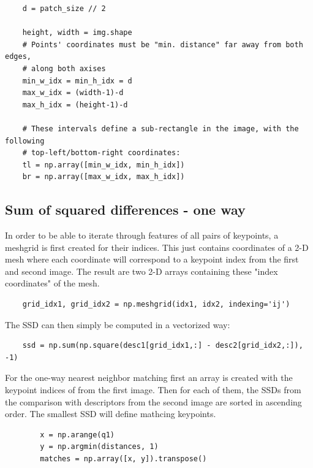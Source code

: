 \documentclass[10pt,a4paper,twoside]{article}
\begin{document}
\begin{verbatim}
    d = patch_size // 2 

    height, width = img.shape
    # Points' coordinates must be "min. distance" far away from both edges,
    # along both axises
    min_w_idx = min_h_idx = d
    max_w_idx = (width-1)-d
    max_h_idx = (height-1)-d

    # These intervals define a sub-rectangle in the image, with the following
    # top-left/bottom-right coordinates:
    tl = np.array([min_w_idx, min_h_idx])
    br = np.array([max_w_idx, max_h_idx])

\end{verbatim}

\subsection{Sum of squared differences - one way}

In order to be able to iterate through features of all pairs of keypoints, a
meshgrid is first created for their indices. This just contains coordinates of a 2-D mesh where
each coordinate will correspond to a keypoint index from the first and second
image. The result are two 2-D arrays containing these "index coordinates" of the mesh.
\begin{verbatim}
    grid_idx1, grid_idx2 = np.meshgrid(idx1, idx2, indexing='ij')
\end{verbatim}

The SSD can then simply be computed in a vectorized way:
\begin{verbatim}
    ssd = np.sum(np.square(desc1[grid_idx1,:] - desc2[grid_idx2,:]), -1)
\end{verbatim}

For the one-way nearest neighbor matching first an array is created with the
keypoint indices of from the first image. Then for each of them, the SSDs from
the comparison with descriptors from the second image are sorted in ascending
order. The smallest SSD will define mathcing keypoints.
\begin{verbatim}
        x = np.arange(q1)
        y = np.argmin(distances, 1)
        matches = np.array([x, y]).transpose()
\end{verbatim}
\end{document}
